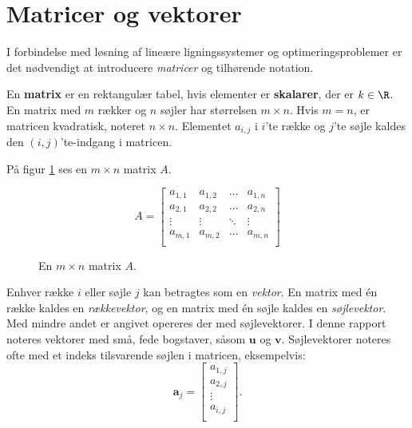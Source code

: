 \section{Matricer og vektorer}
%  
%
I forbindelse med løsning af lineære ligningssystemer og optimeringsproblemer er det nødvendigt at introducere \textit{matricer} og tilhørende notation. 
%
\begin{defn}{}{}
En \textbf{matrix} er en rektangulær tabel, hvis elementer er \textbf{skalarer}, der er $k \in \R$. 
En matrix med $m$ rækker og $n$ søjler har størrelsen $m \times n$.
Hvis $m=n$, er matricen kvadratisk, noteret $n \times n$.
Elementet $a_{i,j}$ i $i$'te række og $j$'te søjle kaldes den $(i,j)$'te-indgang i matricen. 
\end{defn}
\noindent
%
På figur \ref{fig:matrix_gen_eks} ses en $m \times n$ matrix $A$.
%
\begin{figure}[H]
	\begin{center}
$$
A=
\begin{bmatrix}
a_{1,1} & a_{1,2} & \ldots & a_{1,n} \\
a_{2,1} & a_{2,2} & \ldots & a_{2,n} \\
\vdots  & \vdots  & \ddots & \vdots \\
a_{m,1} & a_{m,2} & \ldots & a_{m,n} \\
\end{bmatrix}
$$
	\end{center}
	\caption{En $m \times n$ matrix $A$.}
	\label{fig:matrix_gen_eks}
\end{figure}
%
\noindent
Enhver række $i$ eller søjle $j$ kan betragtes som en \textit{vektor}. 
En matrix med én række kaldes en \textit{rækkevektor}, og en matrix med én søjle kaldes en \textit{søjlevektor}. 
Med mindre andet er angivet opereres der med søjlevektorer.
I denne rapport noteres vektorer med små, fede bogstaver, såsom $\textbf{u}$ og $\textbf{v}$. 
Søjlevektorer noteres ofte med et indeks tilsvarende søjlen i matricen, eksempelvis:
%
$$
\textbf{a}_j= 
\begin{bmatrix}
a_{1,j} \\
a_{2,j} \\
\vdots \\
a_{i,j} \\
\end{bmatrix}.
$$ 